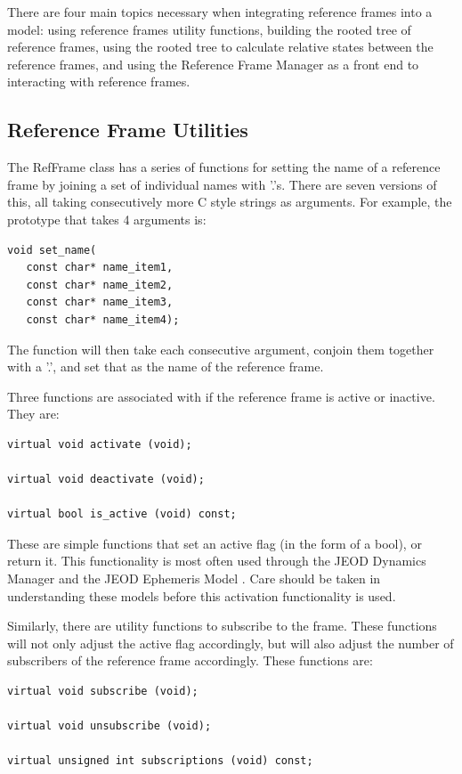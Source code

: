 There are four main topics necessary when integrating reference frames into
a model: using reference frames utility functions,
building the rooted tree of reference frames, using the rooted
tree to calculate relative states between the reference frames, and
using the Reference Frame Manager as a front end to interacting
with reference frames.

\subsection{Reference Frame Utilities}

The RefFrame class has a series of functions for setting
the name of a reference frame by joining a set of individual
names with '.'s. There are seven versions of this, all taking
consecutively more C style strings as arguments. For example,
the prototype that takes 4 arguments is:

\begin{verbatim}
void set_name(
   const char* name_item1,
   const char* name_item2,
   const char* name_item3,
   const char* name_item4);
\end{verbatim}

The function will then take each consecutive argument, conjoin them
together with a '.', and set that as the name of the reference frame.

Three functions are associated with if the reference frame
is active or inactive. They are:

\begin{verbatim}
virtual void activate (void);

virtual void deactivate (void);

virtual bool is_active (void) const;
\end{verbatim}

These are simple functions that set an active flag (in the form of
a bool), or return it. This functionality is most often used through
the JEOD Dynamics Manager \cite{dynenv:DYNMANAGER} and the JEOD
Ephemeris Model \cite{dynenv:EPHEMERIDES}. Care should be taken
in understanding these models before this activation functionality
is used.

Similarly, there are utility functions to subscribe to the frame.
These functions will not only adjust the active flag accordingly, but
will also adjust the number of subscribers of the reference frame
accordingly. These functions are:

\begin{verbatim}
virtual void subscribe (void);

virtual void unsubscribe (void);

virtual unsigned int subscriptions (void) const;
\end{verbatim}

